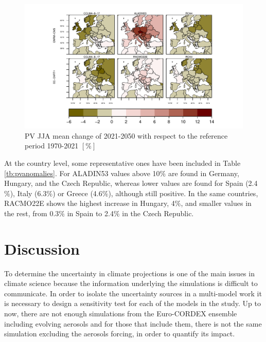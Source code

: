 \begin{figure}[h!]
    \includegraphics[width=1\textwidth]{figs/capitulo7/bycountryJJArelative_area_newscriptall5.pdf}
    \caption[JJA mean relative change of PV productivity over Europe for the period 2021-2050 with respect of 1971-2000]{PV JJA mean change of 2021-2050 with respect to the reference period 1970-2021 $\left[\%\right]$}
\label{fig:pvcountryjja}
\end{figure}

At the country level, some representative ones have been included in Table \ref{tb:pvanomalies}. For ALADIN53 values above 10$\%$ are found in Germany, Hungary, and the Czech Republic, whereas lower values are found for Spain (2.4$\%$), Italy (6.3$\%$) or Greece (4.6$\%$), although still positive. In the same countries, RACMO22E shows the highest increase in Hungary, 4$\%$,  and smaller values in the rest, from 0.3$\%$ in Spain to 2.4$\%$ in the Czech Republic.
 


\section{Discussion}

To determine the uncertainty in climate projections is one of the main issues in climate science because the information underlying the simulations is difficult to communicate. In order to isolate the uncertainty sources in a multi-model work it is necessary to design a sensitivity test for each of the models in the study. Up to now, there are not enough simulations from the Euro-CORDEX ensemble including evolving aerosols and for those that include them, there is not the same simulation excluding the aerosols forcing, in order to quantify its impact.

